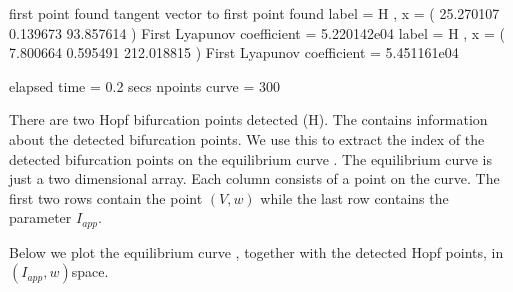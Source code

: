 \documentclass[letterpaper,10pt,english]{jupyterBook}
\begin{document}
\begin{sphinxVerbatim}[commandchars=\\\{\}]
first point found
tangent vector to first point found
label = H , x = ( \PYGZhy{}25.270107 0.139673 93.857614 )
First Lyapunov coefficient = 5.220142e\PYGZhy{}04
label = H , x = ( 7.800664 0.595491 212.018815 )
First Lyapunov coefficient = 5.451161e\PYGZhy{}04

elapsed time  = 0.2 secs
npoints curve = 300
\end{sphinxVerbatim}

\sphinxAtStartPar
There are two Hopf bifurcation points detected (H). The 
 contains information about the detected bifurcation points. We
use this to extract the index of the detected bifurcation points on the
equilibrium curve . The equilibrium curve  is just a two
dimensional array. Each column consists of a point on the curve. The first two
rows contain the point \((V,w)\) while the last row contains the parameter
\(I_{app}\).

\sphinxAtStartPar
Below we plot the equilibrium curve , together with the detected Hopf
points, in \((I_{app},w)\)\sphinxhyphen{}space.
\end{document}
